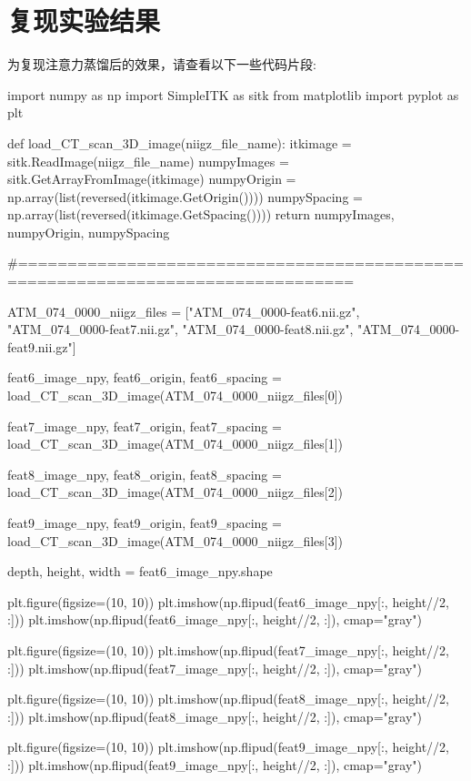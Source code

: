 
\chapter{复现实验结果}\label{chap:reproduce_experiment}

为复现注意力蒸馏后的效果，请查看以下一些代码片段:
\begin{codeblock}[language=python]

import numpy as np
import SimpleITK as sitk
from matplotlib import pyplot as plt

def load_CT_scan_3D_image(niigz_file_name):
    itkimage = sitk.ReadImage(niigz_file_name)
    numpyImages = sitk.GetArrayFromImage(itkimage)
    numpyOrigin = np.array(list(reversed(itkimage.GetOrigin())))
    numpySpacing = np.array(list(reversed(itkimage.GetSpacing())))
    return numpyImages, numpyOrigin, numpySpacing

#================================================================================

ATM_074_0000_niigz_files = ["ATM_074_0000-feat6.nii.gz", 
                            "ATM_074_0000-feat7.nii.gz", 
                            "ATM_074_0000-feat8.nii.gz", 
                            "ATM_074_0000-feat9.nii.gz"]

feat6_image_npy, feat6_origin, feat6_spacing = 
	load_CT_scan_3D_image(ATM_074_0000_niigz_files[0])

feat7_image_npy, feat7_origin, feat7_spacing = 
	load_CT_scan_3D_image(ATM_074_0000_niigz_files[1])

feat8_image_npy, feat8_origin, feat8_spacing = 
	load_CT_scan_3D_image(ATM_074_0000_niigz_files[2])

feat9_image_npy, feat9_origin, feat9_spacing = 
	load_CT_scan_3D_image(ATM_074_0000_niigz_files[3])
	

depth, height, width = feat6_image_npy.shape

plt.figure(figsize=(10, 10))
plt.imshow(np.flipud(feat6_image_npy[:, height//2, :]))
plt.imshow(np.flipud(feat6_image_npy[:, height//2, :]), cmap="gray")

plt.figure(figsize=(10, 10))
plt.imshow(np.flipud(feat7_image_npy[:, height//2, :]))
plt.imshow(np.flipud(feat7_image_npy[:, height//2, :]), cmap="gray")

plt.figure(figsize=(10, 10))
plt.imshow(np.flipud(feat8_image_npy[:, height//2, :]))
plt.imshow(np.flipud(feat8_image_npy[:, height//2, :]), cmap="gray")

plt.figure(figsize=(10, 10))
plt.imshow(np.flipud(feat9_image_npy[:, height//2, :]))
plt.imshow(np.flipud(feat9_image_npy[:, height//2, :]), cmap="gray")
\end{codeblock}

